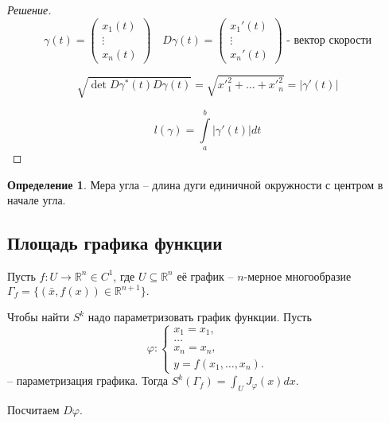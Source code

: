 \documentclass[a5paper]{article}
\newcounter{through}
\theoremstyle{plain}
\theoremstyle{definition}
\newtheorem{definition}[through]{Определение}
\numberwithin{through}{section}
\numberwithin{equation}{section}
\begin{document}
\begin{proof}[Решение]
	\begin{equation*}
	\gamma(t) = 
	\begin{pmatrix}
	x_1(t) \\
	\vdots \\
	x_n(t)
	\end{pmatrix}
	\quad	
	D \gamma(t) = 
	\begin{pmatrix}
	x_1'(t) \\
	\vdots \\
	x_n'(t)
	\end{pmatrix} 
	\text{ - вектор скорости}
	\end{equation*}
	
	\begin{equation*}
	\sqrt{\det D \gamma^* (t) D \gamma (t)} = \sqrt{{x'}_1^2 + \ldots + {x'}_n^2} = |\gamma'(t)|
	\end{equation*}
	
	\begin{equation*}
	l(\gamma) = \int\limits_{a}^{b} |\gamma'(t)|dt
	\end{equation*}
\end{proof}


\begin{definition}
	Мера угла -- длина дуги единичной окружности с центром в начале угла.
\end{definition}


\subsection{Площадь графика функции}


Пусть $f: U \to \mathbb{R}^n \in C^1$, где $U \subseteq \mathbb{R}^n$ её график -- $n$-мерное многообразие 
$\Gamma_f = \{ (\bar{x}, f(x)) \in \mathbb{R}^{n + 1} \}.$

Чтобы найти $S^k$ надо параметризовать график функции. 
Пусть 
\begin{equation*}
\varphi:
	\begin{cases}
	x_1 = x_1, \\
	\ldots \\
	x_n = x_n, \\
	y = f(x_1, \ldots, x_n).
	\end{cases}
\end{equation*}
-- параметризация графика.
Тогда $S^k(\Gamma_f) = \int_U J_{\varphi}(x) dx.$

Посчитаем $D\varphi$. 
\end{document}
